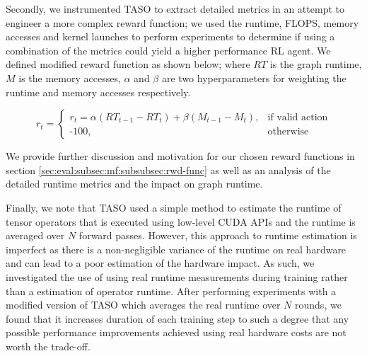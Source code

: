 Secondly, we instrumented TASO to extract detailed metrics in an attempt to engineer a more complex reward function; we used the runtime, FLOPS, memory accesses and kernel launches to perform experiments to determine if using a combination of the metrics could yield a higher performance RL agent. We defined modified reward function as shown below; where $RT$ is the graph runtime, $M$ is the memory accesses, $\alpha$ and $\beta$ are two hyperparameters for weighting the runtime and memory accesses respectively.

$$
r_t =
\begin{cases}
  r_t = \alpha(RT_{t-1} - RT_t) + \beta(M_{t-1} - M_t), & \text{if valid action}\\
  \text{-}100,            & \text{otherwise}
\end{cases}
$$

We provide further discussion and motivation for our chosen reward functions in section \ref{sec:eval:subsec:mf:subsubsec:rwd-func} as well as an analysis of the detailed runtime metrics and the impact on graph runtime.

Finally, we note that TASO used a simple method to estimate the runtime of tensor operators that is executed using low-level CUDA APIs and the runtime is averaged over $N$ forward passes. However, this approach to runtime estimation is imperfect as there is a non-negligible variance of the runtime on real hardware and can lead to a poor estimation of the hardware impact. As such, we investigated the use of using real runtime measurements during training rather than a estimation of operator runtime. After performing experiments with a modified version of TASO which averages the real runtime over $N$ rounds, we found that it increases duration of each training step to such a degree that any possible performance improvements achieved using real hardware costs are not worth the trade-off.
